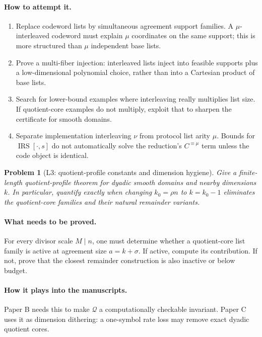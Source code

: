 \documentclass[11pt]{article}
\newtheorem{problem}[theorem]{Problem}
\theoremstyle{definition}
\theoremstyle{remark}
\newcommand{\IRS}{\operatorname{IRS}}
\newcommand{\Int}[2]{#1^{\equiv #2}}
\newcommand{\Qprof}{\mathcal Q}
\newcommand{\paperB}{Paper B}
\newcommand{\paperC}{Paper C}
\begin{document}
\paragraph{How to attempt it.}
\begin{enumerate}[leftmargin=2.2em]
\item Replace codeword lists by simultaneous agreement support families.  A $\mu$-interleaved codeword must explain $\mu$ coordinates on the same support; this is more structured than $\mu$ independent base lists.
\item Prove a multi-fiber injection: interleaved lists inject into feasible supports plus a low-dimensional polynomial choice, rather than into a Cartesian product of base lists.
\item Search for lower-bound examples where interleaving really multiplies list size.  If quotient-core examples do not multiply, exploit that to sharpen the certificate for smooth domains.
\item Separate implementation interleaving $\nu$ from protocol list arity $\mu$.  Bounds for $\IRS[\cdot,s]$ do not automatically solve the reduction's $\Int{C}{\mu}$ term unless the code object is identical.
\end{enumerate}

\begin{problem}[L3: quotient-profile constants and dimension hygiene]
\label{prob:L3}
Give a finite-length quotient-profile theorem for dyadic smooth domains and nearby dimensions $k$.  In particular, quantify exactly when changing $k_0=\rho n$ to $k=k_0-1$ eliminates the quotient-core families and their natural remainder variants.
\end{problem}

\paragraph{What needs to be proved.}  For every divisor scale $M\mid n$, one must determine whether a quotient-core list family is active at agreement size $a=k+\sigma$.  If active, compute its contribution.  If not, prove that the closest remainder construction is also inactive or below budget.

\paragraph{How it plays into the manuscripts.}  \paperB{} needs this to make $\Qprof$ a computationally checkable invariant.  \paperC{} uses it as dimension dithering: a one-symbol rate loss may remove exact dyadic quotient cores.
\end{document}
